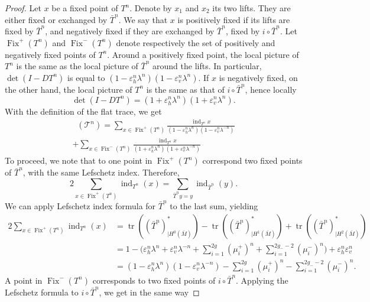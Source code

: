 \documentclass[10pt]{amsart}
\newcommand{\boT}{\mathcal{T}}
\newcommand{\paregg}[1]{\biggl(#1\biggr)}
\newcommand{\restr}{|}
\DeclareMathOperator{\ind}{ind}
\DeclareMathOperator{\Fix}{Fix}
\DeclareMathOperator{\flattr}{\mathrm{tr}^{\flat}}
\DeclareMathOperator{\tr}{tr}
\let\epsilon\varepsilon
\theoremstyle{definition}
\numberwithin{equation}{section}
\begin{document}
\begin{proof}
Let $x$ be a fixed point of $T^n$. Denote by $x_1$ and $x_2$ its two lifts.
They are either fixed or exchanged by $\bar T^n$. We say that $x$ is
positively fixed if its lifts are fixed by $\bar T^n$, and negatively fixed
if they are exchanged by $\bar T^n$, \ie fixed by $i \circ \bar T^n$. Let
$\Fix^+(T^n)$ and $\Fix^-(T^n)$ denote respectively the set of positively and
negatively fixed points of $T^n$. Around a positively fixed point, the local
picture of $T^n$ is the same as the local picture of $\bar T^n$ around the
lifts. In particular, $\det(I-DT^n)$ is equal to $(1-\epsilon_h^n \lambda^n)
(1-\epsilon_v^n \lambda^n)$. If $x$ is negatively fixed, on the other hand,
the local picture of $T^n$ is the same as that of $i \circ \bar T^n$, hence
locally
\[
\det(I-DT^n) = (1+\epsilon_h^n \lambda^n) (1+\epsilon_v^n
\lambda^n).
\]
With the definition of the flat trace, we get
\begin{multline}
\label{eq:wcvlmijmkljwxcvwcx}
\flattr(\boT^n) =
\sum_{x \in \Fix^+(T^n)} \frac{ \ind_{T^n} x}{(1-\epsilon_h^n \lambda^n) (1-\epsilon_v^n \lambda^{-n})}\\[-5pt]
+ \sum_{x \in \Fix^-(T^n)} \frac{ \ind_{T^n} x}{(1+\epsilon_h^n \lambda^n) (1+\epsilon_v^n \lambda^{-n})}
\end{multline}
To proceed, we note that to one point in $\Fix^+(T^n)$ correspond two fixed
points of $\bar T^n$, with the same Lefschetz index. Therefore,
\begin{equation*}
2\sum_{x \in \Fix^+(T^n)} \ind_{T^n}(x) = \sum_{\bar T^n y = y} \ind_{\bar T^n}(y).
\end{equation*}
We can apply Lefschetz index formula for $\bar T^n$ to the last sum, yielding\vspace*{-3pt}
\begin{align*}
2\sum_{x \in \Fix^+(T^n)} \ind_{T^n}(x) & = \tr((\bar T^n)_{\restr H^0(\bar M)}^*) - \tr((\bar T^n)_{\restr H^1(\bar M)}^*) + \tr((\bar T^n)_{\restr H^2(\bar M)}^*)
\\[-7pt]
& = 1 - \paregg{\epsilon_h^n \lambda^n + \epsilon_v^n \lambda^{-n} + \sum_{i=1}^{2g} (\mu_i^+)^n + \sum_{i=1}^{2g_--2} (\mu_i^-)^n } + \epsilon_h^n \epsilon_v^n
\\& = (1-\epsilon_h^n \lambda^n) (1-\epsilon_v^n \lambda^{-n}) - \sum_{i=1}^{2g} (\mu_i^+)^n - \sum_{i=1}^{2g_--2} (\mu_i^-)^n.
\end{align*}
A point in $\Fix^-(T^n)$ corresponds to two fixed points of $i \circ \bar
T^n$. Applying the Lefschetz formula to $i\circ \bar T^n$, we get in the same
way\vspace*{-3pt}

\end{proof}
\end{document}
